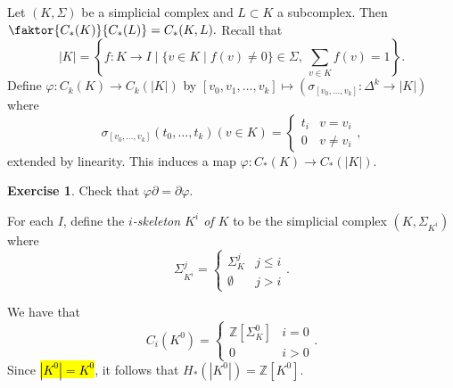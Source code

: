 \documentclass[10pt,letterpaper,cm]{nupset}
\theoremstyle{definition}
\theoremstyle{theorem}
\newtheorem{exercise}[definition]{Exercise}
\theoremstyle{remark}
\newcommand{\Z}{\mathbb Z}
\newcommand{\1}{\mathbb{1}}
\newcommand{\0}{\vec 0}
\begin{document}
\smallskip

Let $\left(K, \Sigma\right)$ be a simplicial complex and $L \subset K$ a subcomplex. Then  $\faktor{C_{\ast}(K)}{C_{\ast}(L)} = C_{\ast}(K,L).$ Recall that $$\left\lvert{K}\right\rvert=\left\{f: K \to I \mid \{v\in K \mid f(v) \ne 0\} \in \Sigma, \ \sum_{v\in K}f(v) =1\right\} .$$ Define $\varphi : C_k(K) \to C_k(\left\lvert{K}\right\rvert)$ by $\left[v_0, v_1, \ldots, v_k\right] \mapsto \left(\sigma_{\left[v_0, \ldots, v_k\right]} : \Delta^k \to \left\lvert{K}\right\rvert\right)$ where $$\sigma_{\left[v_0, \ldots, v_k\right]}(t_0, \ldots, t_k)(v \in K) = \begin{cases} t_i & v=v_i \\ 0 & v \ne v_i \end{cases},$$ extended by linearity. This induces a map $\varphi : C_{\ast}(K) \to C_{\ast}(\left\lvert{K}\right\rvert)$.


\begin{exercise}
Check that $\varphi \partial = \partial \varphi$.
\end{exercise}


For each $I$, define the \textit{$i$-skeleton $K^i$ of $K$} to be the simplicial complex $\left(K, \Sigma_{K^i}\right)$ where $$\Sigma_{K^i}^j = \begin{cases} \Sigma_K^j & j \leq i \\ \emptyset & j >i \end{cases}.$$

We have that $$C_i(K^0) = \begin{cases} \Z\left[\Sigma_K^0\right] & i =0 \\ 0 & i>0\end{cases}.$$ Since \hl{$\left\lvert{K^0}\right\rvert = K^0$}, it follows that $H_{\ast}(\left\lvert{K^0}\right\rvert) = \Z\left[K^0\right]$.
\end{document}
